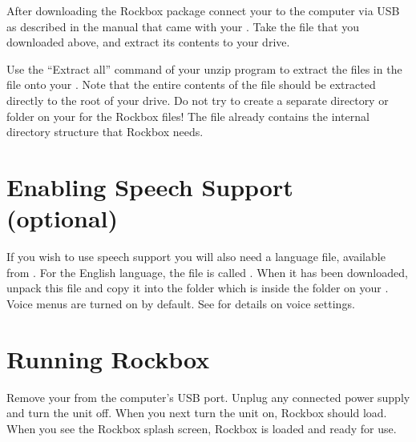 After downloading the Rockbox package connect your \dap{} to the computer via 
USB as described in the manual that came with your \dap{}. Take the file that 
you downloaded above, and extract its contents to your \daps{} drive.

Use the ``Extract all'' command of your unzip program to extract the files in 
the  file onto your \dap{}. Note that the entire contents of the 
 file should be extracted directly to the root of your \daps{} 
drive.  Do not try to create a separate directory or folder on your \dap{} for 
the Rockbox files!  The  file already contains the internal 
directory structure that Rockbox needs. 


\section{Enabling Speech Support (optional)}\label{sec:enabling_speech_support}
If you wish to use speech support you will also need a language file, available
from . For the English language, the file is called
. When it has been downloaded, unpack this file and copy 
it into the  folder which is inside the  folder on
your \dap{}. Voice menus are turned on by default. See
 for details on voice settings.

\section{Running Rockbox} 
Remove your \dap{} from the computer's USB port. Unplug any connected power 
supply and turn the unit off. When you next turn the unit on, Rockbox should 
load. When you see the Rockbox splash screen, Rockbox is loaded and ready for 
use.


